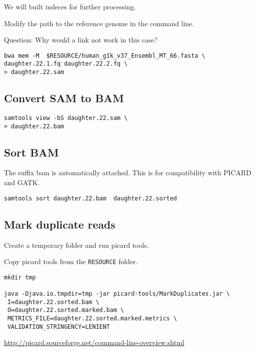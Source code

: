 \documentclass{article}
\begin{document}
We will built indeces for further processing.

Modify the path to the reference genome in the command line. 

Question: Why would a link not work in this case?

\begin{verbatim}
bwa mem -M  $RESOURCE/human_g1k_v37_Ensembl_MT_66.fasta \
daughter.22.1.fq daughter.22.2.fq \
> daughter.22.sam
\end{verbatim}

\subsection{Convert SAM to BAM}
\begin{verbatim}
samtools view -bS daughter.22.sam \
> daughter.22.bam
\end{verbatim}
\subsection{Sort BAM}
The suffix bam is automatically attached. This is for compatibility with PICARD and GATK.

\begin{verbatim}
samtools sort daughter.22.bam  daughter.22.sorted 
\end{verbatim}

\subsection{Mark duplicate reads}

Create a temporary folder and run picard tools.

Copy picard tools from the \verb+RESOURCE+ folder.
\begin{verbatim}
mkdir tmp

java -Djava.io.tmpdir=tmp -jar picard-tools/MarkDuplicates.jar \
 I=daughter.22.sorted.bam \
 O=daughter.22.sorted.marked.bam \
 METRICS_FILE=daughter.22.sorted.marked.metrics \
 VALIDATION_STRINGENCY=LENIENT

\end{verbatim}        
\url{http://picard.sourceforge.net/command-line-overview.shtml}
\end{document}
